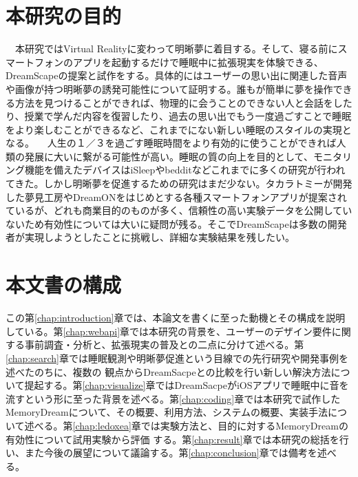 \section{本研究の目的}
　本研究ではVirtual Realityに変わって明晰夢に着目する。そして、寝る前にスマートフォンのアプリを起動するだけで睡眠中に拡張現実を体験できる、DreamScapeの提案と試作をする。具体的にはユーザーの思い出に関連した音声や画像が持つ明晰夢の誘発可能性について証明する。誰もが簡単に夢を操作できる方法を見つけることができれば、物理的に会うことのできない人と会話をしたり、授業で学んだ内容を復習したり、過去の思い出でもう一度過ごすことで睡眠をより楽しむことができるなど、これまでにない新しい睡眠のスタイルの実現となる。
　人生の１／３を過ごす睡眠時間をより有効的に使うことができれば人類の発展に大いに繋がる可能性が高い。睡眠の質の向上を目的として、モニタリング機能を備えたデバイスはiSleep\cite{iSleep}やbeddit\cite{beddit}などこれまでに多くの研究が行われてきた。しかし明晰夢を促進するための研究はまだ少ない。タカラトミーが開発した夢見工房\cite{takaratomi}やDreamON\cite{dreamOn}をはじめとする各種スマートフォンアプリが提案されているが、どれも商業目的のものが多く、信頼性の高い実験データを公開していないため有効性については大いに疑問が残る。そこでDreamScapeは多数の開発者が実現しようとしたことに挑戦し、詳細な実験結果を残したい。

\section{本文書の構成}
この第\ref{chap:introduction}章では、本論文を書くに至った動機とその構成を説明している。第\ref{chap:webapi}章では本研究の背景を、ユーザーのデザイン要件に関する事前調査・分析と、拡張現実の普及との二点に分けて述べる。第\ref{chap:search}章では睡眠観測や明晰夢促進という目線での先行研究や開発事例を述べたのちに、複数の 観点からDreamSacpeとの比較を行い新しい解決方法について提起する。第\ref{chap:visualize}章ではDreamSacpeがiOSアプリで睡眠中に音を流すという形に至った背景を述べる。第\ref{chap:coding}章では本研究で試作した MemoryDreamについて、その概要、利用方法、システムの概要、実装手法について述べる。第\ref{chap:ledoxea}章では実験方法と、目的に対するMemoryDreamの有効性について試用実験から評価 する。第\ref{chap:result}章では本研究の総括を行い、また今後の展望について議論する。第\ref{chap:conclusion}章では備考を述べる。

